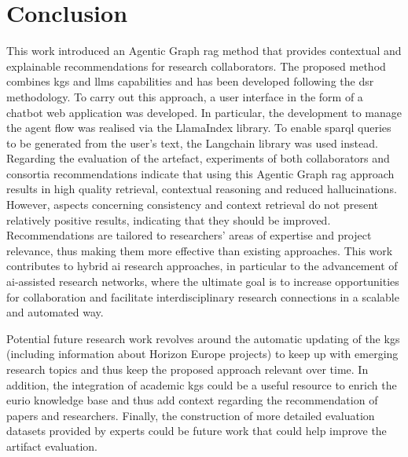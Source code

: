 \chapter{Conclusion}\label{chap:conclusion}
This work introduced an Agentic Graph \gls{rag} method that provides contextual and explainable recommendations for research collaborators.
The proposed method combines \glspl{kg} and \glspl{llm} capabilities and has been developed following the \acrlong{dsr} methodology.
To carry out this approach, a user interface in the form of a chatbot web application was developed.
In particular, the development to manage the agent flow was realised via the LlamaIndex library.
To enable \gls{sparql} queries to be generated from the user's text, the Langchain library was used instead.
Regarding the evaluation of the artefact, experiments of both collaborators and consortia recommendations indicate that using this Agentic Graph \gls{rag} approach results in high quality retrieval, contextual reasoning and reduced hallucinations.
However, aspects concerning consistency and context retrieval do not present relatively positive results, indicating that they should be improved.
Recommendations are tailored to researchers' areas of expertise and project relevance, thus making them more effective than existing approaches. 
This work contributes to hybrid \gls{ai} research approaches, in particular to the advancement of \gls{ai}-assisted research networks, where the ultimate goal is to increase opportunities for collaboration and facilitate interdisciplinary research connections in a scalable and automated way.

Potential future research work revolves around the automatic updating of the \glspl{kg} (including information about Horizon Europe projects) to keep up with emerging research topics and thus keep the proposed approach relevant over time.
In addition, the integration of academic \glspl{kg} could be a useful resource to enrich the \gls{eurio} knowledge base and thus add context regarding the recommendation of papers and researchers.
Finally, the construction of more detailed evaluation datasets provided by experts could be future work that could help improve the artifact evaluation.